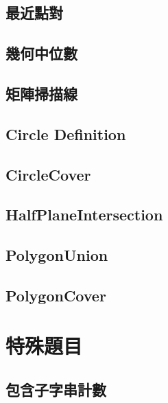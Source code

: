 \subsection{最近點對}


\subsection{幾何中位數}


\subsection{矩陣掃描線}


\subsection{Circle Definition}


\subsection{CircleCover}


\subsection{HalfPlaneIntersection}


\subsection{PolygonUnion}


\subsection{PolygonCover}


\section{特殊題目}

\subsection{包含子字串計數}


